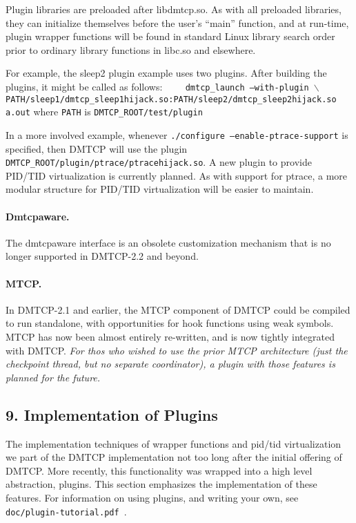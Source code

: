 \documentclass{article}
\begin{document}
Plugin libraries are preloaded after libdmtcp.so.  As with all
preloaded libraries, they can initialize themselves before the user's
``main'' function, and at run-time, plugin wrapper functions will
be found in standard Linux library search order prior to ordinary
library functions in libc.so and elsewhere.

For example, the sleep2 plugin example uses two plugins.  After building
the plugins, it might be called as follows: \newline
{\tt
\hbox{\ \ }  dmtcp\_launch --with-plugin $\backslash$ \newline
\hbox{\ \ \ \ }
 PATH/sleep1/dmtcp\_sleep1hijack.so:PATH/sleep2/dmtcp\_sleep2hijack.so a.out}
 \newline
where {\tt PATH} is {\tt DMTCP\_ROOT/test/plugin}

In a more involved example, whenever {\tt ./configure
--enable-ptrace-support} is specified, then DMTCP will use the plugin
{\tt DMTCP\_ROOT/plugin/ptrace/ptracehijack.so}.  A new plugin to
provide PID/TID virtualization is currently planned.  As with support
for ptrace, a more modular structure for PID/TID virtualization will be
easier to maintain.

\paragraph{Dmtcpaware.}

The dmtcpaware interface is an obsolete customization mechanism that is no
longer supported in \hbox{DMTCP-2.2} and beyond.

\paragraph{MTCP.}

In DMTCP-2.1 and earlier, the MTCP component of DMTCP could be compiled
to run standalone, with opportunities for hook functions using weak symbols.
MTCP has now been almost entirely re-written, and is now tightly integrated
with DMTCP.  {\em For thos who wished to use the prior MTCP architecture
(just the checkpoint thread, but no separate coordinator), a plugin
with those features is planned for the future.}

\subsection*{9. Implementation of Plugins}

The implementation techniques of wrapper functions and pid/tid virtualization
we part of the DMTCP implementation not too long after the
initial offering of DMTCP.  More recently, this functionality was
wrapped into a high level abstraction, plugins.  This section emphasizes
the implementation of these features.  For information on using plugins,
and writing your own, see {\tt doc/plugin-tutorial.pdf}~.
\end{document}
